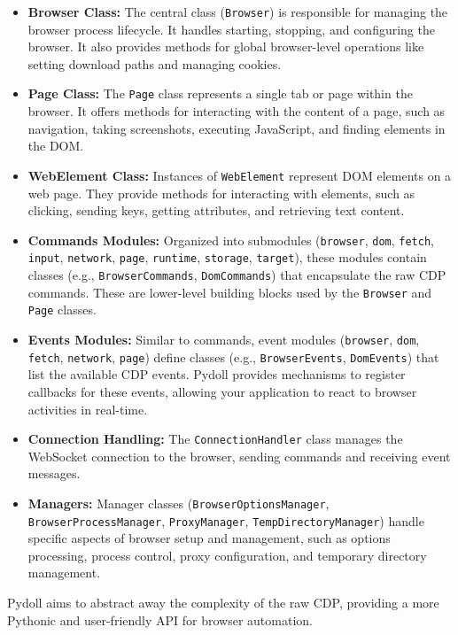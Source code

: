 \documentclass{article}
\begin{document}
\begin{itemize}
    \item \textbf{Browser Class:} The central class (\texttt{Browser}) is responsible for managing the browser process lifecycle. It handles starting, stopping, and configuring the browser. It also provides methods for global browser-level operations like setting download paths and managing cookies.
    \item \textbf{Page Class:} The \texttt{Page} class represents a single tab or page within the browser. It offers methods for interacting with the content of a page, such as navigation, taking screenshots, executing JavaScript, and finding elements in the DOM.
    \item \textbf{WebElement Class:} Instances of \texttt{WebElement} represent DOM elements on a web page. They provide methods for interacting with elements, such as clicking, sending keys, getting attributes, and retrieving text content.
    \item \textbf{Commands Modules:} Organized into submodules (\texttt{browser}, \texttt{dom}, \texttt{fetch}, \texttt{input}, \texttt{network}, \texttt{page}, \texttt{runtime}, \texttt{storage}, \texttt{target}), these modules contain classes (e.g., \texttt{BrowserCommands}, \texttt{DomCommands}) that encapsulate the raw CDP commands. These are lower-level building blocks used by the \texttt{Browser} and \texttt{Page} classes.
    \item \textbf{Events Modules:} Similar to commands, event modules (\texttt{browser}, \texttt{dom}, \texttt{fetch}, \texttt{network}, \texttt{page}) define classes (e.g., \texttt{BrowserEvents}, \texttt{DomEvents}) that list the available CDP events. Pydoll provides mechanisms to register callbacks for these events, allowing your application to react to browser activities in real-time.
    \item \textbf{Connection Handling:} The \texttt{ConnectionHandler} class manages the WebSocket connection to the browser, sending commands and receiving event messages.
    \item \textbf{Managers:} Manager classes (\texttt{BrowserOptionsManager}, \texttt{BrowserProcessManager}, \texttt{ProxyManager}, \texttt{TempDirectoryManager}) handle specific aspects of browser setup and management, such as options processing, process control, proxy configuration, and temporary directory management.
\end{itemize}

\noindent Pydoll aims to abstract away the complexity of the raw CDP, providing a more Pythonic and user-friendly API for browser automation.
\end{document}
